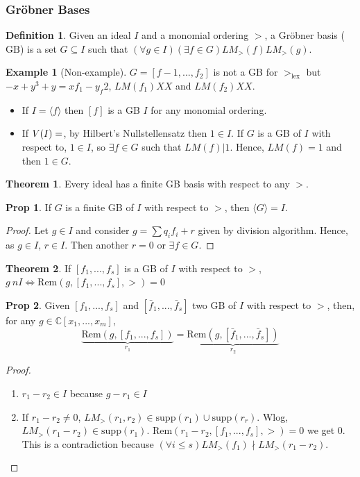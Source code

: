 \documentclass{article}
\theoremstyle{definition}
\newtheorem{thm}{Theorem}
\newtheorem*{prop}{Prop}
\newtheorem*{defn}{Definition}
\newtheorem{ex}{Example}
\newcommand{\C}{\mathbb{C}}
\newcommand{\supp}{\text{supp}}
\newcommand{\Rem}{\text{Rem}}
\newcommand{\lex}{\text{lex}}
\newcommand{\GB}{\text{GB}}
\begin{document}
\subsubsection{Gröbner Bases}
\begin{defn}
	Given an ideal $I$ and a monomial ordering $>$, a Gröbner basis ($\GB$) is a set $G\subseteq I$ such that $(\forall g\in I)(\exists f\in G) LM_>(f)LM_>(g)$.
\end{defn}
\begin{ex}[Non-example]
	$G=[f-1,...,f_2]$ is not a GB for $>_\lex$ but $-x+y^3+y=xf_1-y_f2$, $LM(f_1)XX$ and $LM(f_2)XX$.
	\begin{itemize}
		\item If $I=\langle f\rangle$ then $[f]$ is a GB $I$ for any monomial ordering.
		\item If $V(I)=\empty$, by Hilbert's Nullstellensatz then $1\in I$. If $G$ is a GB of $I$ with respect to, $1\in I$, so $\exists f\in G$ such that $LM(f)|1$. Hence, $LM(f)=1$ and then $1\in G$.
	\end{itemize}
\end{ex}
\begin{thm}
	Every ideal has a finite GB basis with respect to any $>$.
\end{thm}
\begin{prop}
	If $G$ is a finite GB of $I$ with respect to $>$, then $\langle G\rangle=I$.
\end{prop}
\begin{proof}
	Let $g\in I$ and consider $g=\sum q_if_i+r$ given by division algorithm. Hence, as $g\in I$, $r\in I$. Then another $r=0$ or $\exists f\in G$.
\end{proof}
\begin{thm}
	If $[f_1,...,f_s]$ is a GB of $I$ with respect to $>$, $g\ n I\iff\Rem(g,[f_1,...,f_s],>)=0$
\end{thm}
\begin{prop}
	Given $[f_1,...,f_s]$ and $[\bar f_1,...,\bar f_s]$ two GB of $I$ with respect to $>$, then, for any $g\in\C[x_1,...,x_m]$,
	$$\underbrace{\Rem(g,[f_1,...,f_s])}_{r_1}=\underbrace{\Rem(g,[\bar f_1,...,\bar f_s])}_{r_2}$$
	\begin{proof}
		\begin{enumerate}
			\item $r_1-r_2\in I$ because $g-r_1\in I$
			\item If $r_1-r_2\neq0$, $LM_>(r_1,r_2)\in\supp(r_1)\cup \supp(r_r)$. Wlog, $LM_>(r_1-r_2)\in\supp(r_1)$. $\Rem(r_1-r_2,[f_1,...,f_s],>)=0$ we get 0. This is a contradiction because $(\forall i\leq s)LM_>(f_1)\nmid LM_>(r_1-r_2)$.
		\end{enumerate}
	\end{proof}
\end{prop}
\end{document}
